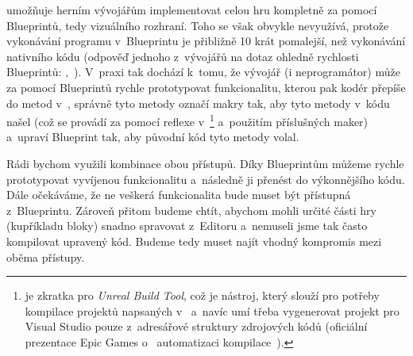 \UE{} umožňuje herním vývojářům implementovat celou hru kompletně za pomocí Blueprintů, tedy vizuálního rozhraní. Toho se však obvykle nevyužívá, protože vykonávání programu v~Blueprintu je přibližně 10 krát pomalejší, než vykonávání nativního \CPP{} kódu (odpověď jednoho z~vývojářů \UE{} na dotaz ohledně rychlosti Blueprintů: ,~\citep{ue_performance}). V~praxi tak dochází k~tomu, že vývojář (i neprogramátor) může za pomocí Blueprintů rychle prototypovat funkcionalitu, kterou pak kodér přepíše do metod v~\CPP{}, správně tyto metody označí makry tak, aby \UE{} tyto metody v~kódu našel (což se provádí za pomocí reflexe v~\UBT{}\footnote{\UBT{} je zkratka pro \textit{Unreal Build Tool}, což je \CS{} nástroj, který slouží pro potřeby kompilace projektů napsaných v~\UEu{} a~navíc umí třeba vygenerovat projekt pro Visual Studio pouze z~adresářové struktury zdrojových kódů (oficiální prezentace Epic Games o~ automatizaci kompilace~\citep{ue_ubt}).} a~použitím příslušných \CPP{} maker) a~upraví Blueprint tak, aby původní kód tyto metody volal.
 
Rádi bychom využili kombinace obou přístupů. Díky Blueprintům můžeme rychle prototypovat vyvíjenou funkcionalitu a~následně ji přenést do výkonnějšího \CPP{} kódu. Dále očekáváme, že ne veškerá funkcionalita bude muset být přístupná z~Blueprintu. Zároveň přitom budeme chtít, abychom mohli určité části hry (kupříkladu bloky) snadno spravovat z~Editoru a~nemuseli jsme tak často kompilovat upravený kód. Budeme tedy muset najít vhodný kompromis mezi oběma přístupy.
